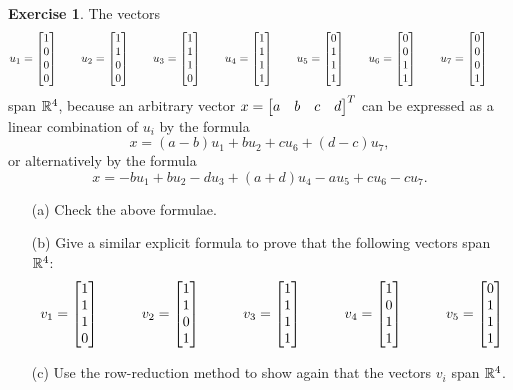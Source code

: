 \documentclass[a4paper]{amsart}
\theoremstyle{definition}
\newtheorem{exercise}{Exercise}
\begin{document}
\begin{exercise}\label{ex-fullspan-iii}
 The vectors 
 \[ u_1 = \left[\begin{matrix} 1 \\ 0 \\ 0 \\ 0 \end{matrix}\right] \qquad
    u_2 = \left[\begin{matrix} 1 \\ 1 \\ 0 \\ 0 \end{matrix}\right] \qquad
    u_3 = \left[\begin{matrix} 1 \\ 1 \\ 1 \\ 0 \end{matrix}\right] \qquad
    u_4 = \left[\begin{matrix} 1 \\ 1 \\ 1 \\ 1 \end{matrix}\right] \qquad
    u_5 = \left[\begin{matrix} 0 \\ 1 \\ 1 \\ 1 \end{matrix}\right] \qquad
    u_6 = \left[\begin{matrix} 0 \\ 0 \\ 1 \\ 1 \end{matrix}\right] \qquad
    u_7 = \left[\begin{matrix} 0 \\ 0 \\ 0 \\ 1 \end{matrix}\right] \qquad
 \]
 span ${\mathbb{R}}^4$, because an arbitrary vector
 $x=\left[\begin{matrix} a & b & c & d\end{matrix}\right]^T$ can be expressed as a linear combination
 of $u_i$ by the formula 
 \[ x = (a-b)u_1 + b u_2 + c u_6 + (d-c)u_7, \]
 or alternatively by the formula
 \[ x = -bu_1+bu_2-du_3+(a+d)u_4 -a u_5 + cu_6 -cu_7. \]
 \begin{itemize}
  \item[(a)] Check the above formulae.
  \item[(b)] Give a similar explicit formula to prove that the
   following vectors span ${\mathbb{R}}^4$:
   \[ v_1 = \left[\begin{matrix} 1 \\ 1 \\ 1 \\ 0 \end{matrix}\right] \hspace{3em}
      v_2 = \left[\begin{matrix} 1 \\ 1 \\ 0 \\ 1 \end{matrix}\right] \hspace{3em}
      v_3 = \left[\begin{matrix} 1 \\ 1 \\ 1 \\ 1 \end{matrix}\right] \hspace{3em}
      v_4 = \left[\begin{matrix} 1 \\ 0 \\ 1 \\ 1 \end{matrix}\right] \hspace{3em}
      v_5 = \left[\begin{matrix} 0 \\ 1 \\ 1 \\ 1 \end{matrix}\right]
   \]
  \item[(c)] Use the row-reduction method to show again that the
   vectors $v_i$ span ${\mathbb{R}}^4$.
 \end{itemize}
\end{exercise}
\end{document}
